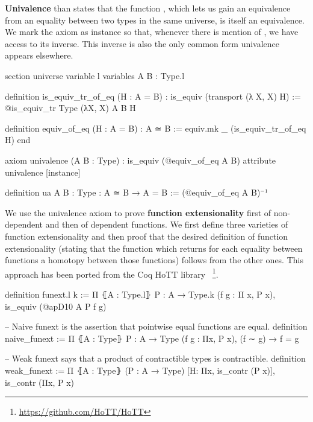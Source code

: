 \textbf{Univalence} than states that the function , which lets
us gain an equivalence from an equality between two types in the same universe,
is itself an equivalence.
We mark the axiom as instance so that, whenever there is mention of ,
we have access to its inverse.
This inverse  is also the only common form univalence appears elsewhere.
\begin{leancodebr}
section
  universe variable l
  variables {A B : Type.{l}}

  definition is_equiv_tr_of_eq (H : A = B) :
    is_equiv (transport (λ X, X) H) :=
  @is_equiv_tr Type (λX, X) A B H

  definition equiv_of_eq (H : A = B) : A ≃ B :=
  equiv.mk _ (is_equiv_tr_of_eq H)
end

axiom univalence (A B : Type) : is_equiv (@equiv_of_eq A B)
attribute univalence [instance]

definition ua {A B : Type} : A ≃ B → A = B := (@equiv_of_eq A B)⁻¹
\end{leancodebr}

We use the univalence axiom to prove \textbf{function extensionality} first of
non-dependent and then of dependent functions.
We first define three varieties of function extensionality and then proof that
the desired definition of function extensionality (stating that the function
 which returns for each equality between functions a homotopy
between those functions) follows from the other ones.
This approach has been ported from the Coq HoTT library
~\footnote{\url{https://github.com/HoTT/HoTT}}.
\begin{leancode}
definition funext.{l k} := 
Π ⦃A : Type.{l}⦄ {P : A → Type.{k}} (f g : Π x, P x),
  is_equiv (@apD10 A P f g)

-- Naive funext is the assertion that pointwise equal functions are equal.
definition naive_funext :=
Π ⦃A : Type⦄ {P : A → Type} (f g : Πx, P x), (f ∼ g) → f = g

-- Weak funext says that a product of contractible types is contractible.
definition weak_funext :=
Π ⦃A : Type⦄ (P : A → Type) [H: Πx, is_contr (P x)], is_contr (Πx, P x)
\end{leancode}


